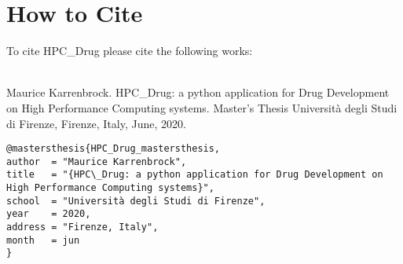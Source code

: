 
\chapter{How to Cite}

To cite HPC\_Drug please cite the following works:

\cite{HPC_Drug_mastersthesis}\\
Maurice Karrenbrock. HPC\_Drug: a python application for Drug Development on High Performance Computing systems. Master's Thesis Università degli Studi di Firenze, Firenze, Italy, June, 2020.
\begin{verbatim}
@mastersthesis{HPC_Drug_mastersthesis,
author  = "Maurice Karrenbrock",
title   = "{HPC\_Drug: a python application for Drug Development on High Performance Computing systems}",
school  = "Università degli Studi di Firenze",
year    = 2020,
address = "Firenze, Italy",
month   = jun
}
\end{verbatim}
